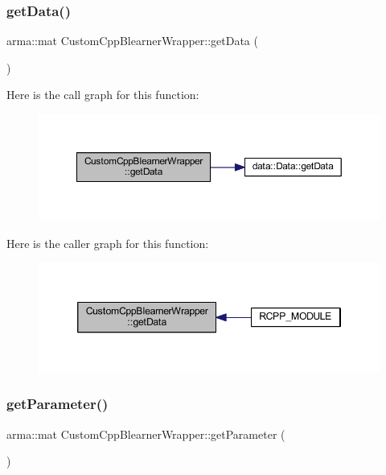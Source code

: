 \subsubsection{\texorpdfstring{get\+Data()}{getData()}}
{\footnotesize\ttfamily arma\+::mat Custom\+Cpp\+Blearner\+Wrapper\+::get\+Data (\begin{DoxyParamCaption}{ }\end{DoxyParamCaption})\hspace{0.3cm}{\ttfamily [inline]}}

Here is the call graph for this function\+:\nopagebreak
\begin{figure}[H]
\begin{center}
\leavevmode
\includegraphics[width=350pt]{class_custom_cpp_blearner_wrapper_a015410ca4260c3e5586ab7923ef2d624_cgraph}
\end{center}
\end{figure}
Here is the caller graph for this function\+:\nopagebreak
\begin{figure}[H]
\begin{center}
\leavevmode
\includegraphics[width=346pt]{class_custom_cpp_blearner_wrapper_a015410ca4260c3e5586ab7923ef2d624_icgraph}
\end{center}
\end{figure}
\mbox{\label{class_custom_cpp_blearner_wrapper_a604cbaa8f8fe0bc5fda3a9baad13f646}} 
\subsubsection{\texorpdfstring{get\+Parameter()}{getParameter()}}
{\footnotesize\ttfamily arma\+::mat Custom\+Cpp\+Blearner\+Wrapper\+::get\+Parameter (\begin{DoxyParamCaption}{ }\end{DoxyParamCaption})\hspace{0.3cm}{\ttfamily [inline]}}

